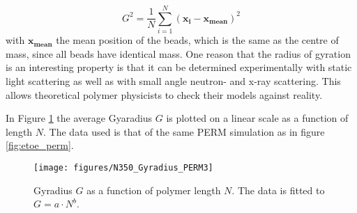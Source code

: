 \begin{equation}
    G^2 = \frac{1}{N} \sum_{i=1}^N \left( \mathbf{x_i} - \mathbf{x_{mean}} \right)^2
\end{equation}
with $\mathbf{x_{mean}}$ the mean position of the beads, which is the same as the centre of mass, since all beads have identical mass. One reason that the radius of gyration is an interesting property is that it can be determined experimentally with static light scattering as well as with small angle neutron- and x-ray scattering. This allows theoretical polymer physicists to check their models against reality. \cite{grosberg1994}

In Figure \ref{fig:gyradius} the average Gyaradius $G$ is plotted on a linear scale as a function of length $N$. The data used is that of the same PERM simulation as in figure \ref{fig:etoe_perm}.

\begin{figure}[ht!]
\centering
\texttt{[image: figures/N350\_Gyradius\_PERM3]}
\caption{Gyradius $G$ as a function of polymer length $N$. The data is fitted to $G=a\cdot N^b$.}
\label{fig:gyradius}
\end{figure}